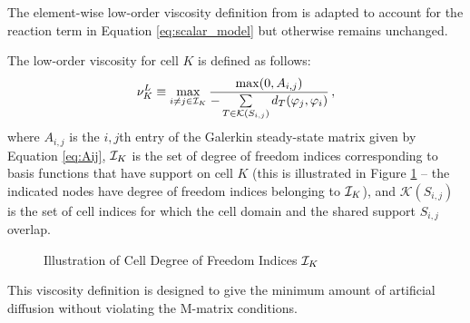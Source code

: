 The element-wise low-order viscosity definition from \cite{guermond_firstorder} is
adapted to account for the reaction term in Equation \eqref{eq:scalar_model}
but otherwise remains unchanged.
\begin{defn}
  The low-order viscosity for cell $K$ is defined as follows:
  \begin{equation}
    \nu^L_K \equiv \max\limits_{i\ne j\in\mathcal{I}_K}
      \frac{\max(0,A_{i,j})}
      {-\sum\limits_{T\in \mathcal{K}(S_{i,j})}d_T(\varphi_j,\varphi_i)}
      \,,
  \end{equation}
  where $A_{i,j}$ is the $i,j$th entry of the Galerkin steady-state matrix
  given by Equation \eqref{eq:Aij}, $\mathcal{I}_K$ is the set of degree of freedom
  indices corresponding to basis functions that have support on cell $K$
  (this is illustrated in Figure \ref{fig:cell_indices} -- the indicated
  nodes have degree of freedom indices belonging to $\mathcal{I}_K$), and
  $\mathcal{K}(S_{i,j})$ is the set of cell indices for which the cell
  domain and the shared support $S_{i,j}$ overlap.
\end{defn}
\begin{figure}[ht]
   \centering
     
      \caption{Illustration of Cell Degree of Freedom Indices $\mathcal{I}_K$}
   \label{fig:cell_indices}
\end{figure}
This viscosity definition is designed to give the minimum amount of artificial
diffusion without violating the M-matrix conditions.

